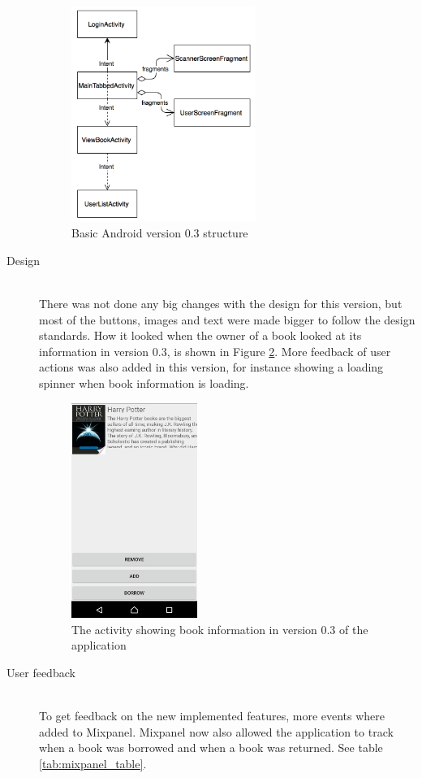 \begin{description}
\begin{figure}
\centering
\includegraphics[height=7cm]{figs/v03/AndroidStructure-03.png}
\caption{Basic Android version 0.3 structure}
\label{fig:AndroidStructure03}
\end{figure}

    \item[Design] \hfill\\
There was not done any big changes with the design for this version, but most of the buttons, images and text were made bigger to follow the design standards. How it looked when the owner of a book looked at its information in version 0.3, is shown in Figure \ref{fig:book-view-v3}. More feedback of user actions was also added in this version, for instance showing a loading spinner when book information is loading.  

\begin{figure}
\centering
\includegraphics[height=7cm]{figs/v03/bookView03.png}
\caption{The activity showing book information in version 0.3 of the application}
\label{fig:book-view-v3}
\end{figure}

    \item[User feedback] \hfill\\
To get feedback on the new implemented features, more events where added to Mixpanel. Mixpanel now also allowed the application to track when a book was borrowed and when a book was returned. See table \ref{tab:mixpanel_table}.


\end{description}
